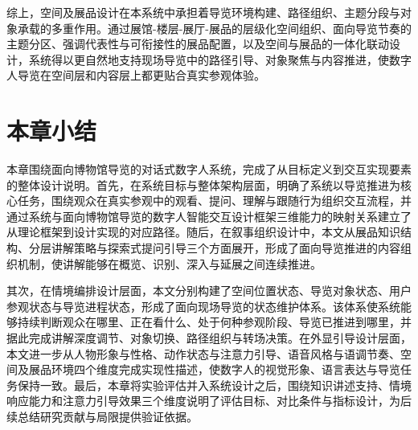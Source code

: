 综上，空间及展品设计在本系统中承担着导览环境构建、路径组织、主题分段与对象承载的多重作用。通过展馆-楼层-展厅-展品的层级化空间组织、面向导览节奏的主题分区、强调代表性与可衔接性的展品配置，以及空间与展品的一体化联动设计，系统得以更自然地支持现场导览中的路径引导、对象聚焦与内容推进，使数字人导览在空间层和内容层上都更贴合真实参观体验。



\section{本章小结}
本章围绕面向博物馆导览的对话式数字人系统，完成了从目标定义到交互实现要素的整体设计说明。首先，在系统目标与整体架构层面，明确了系统以导览推进为核心任务，围绕观众在真实参观中的观看、提问、理解与跟随行为组织交互流程，并通过系统与面向博物馆导览的数字人智能交互设计框架三维能力的映射关系建立了从理论框架到设计实现的对应路径。随后，在叙事组织设计中，本文从展品知识结构、分层讲解策略与探索式提问引导三个方面展开，形成了面向导览推进的内容组织机制，使讲解能够在概览、识别、深入与延展之间连续推进。

其次，在情境编排设计层面，本文分别构建了空间位置状态、导览对象状态、用户参观状态与导览进程状态，形成了面向现场导览的状态维护体系。该体系使系统能够持续判断观众在哪里、正在看什么、处于何种参观阶段、导览已推进到哪里，并据此完成讲解深度调节、对象切换、路径组织与转场决策。在外显引导设计层面，本文进一步从人物形象与性格、动作状态与注意力引导、语音风格与语调节奏、空间及展品环境四个维度完成实现性描述，使数字人的视觉形象、语言表达与导览任务保持一致。最后，本章将实验评估并入系统设计之后，围绕知识讲述支持、情境响应能力和注意力引导效果三个维度说明了评估目标、对比条件与指标设计，为后续总结研究贡献与局限提供验证依据。
